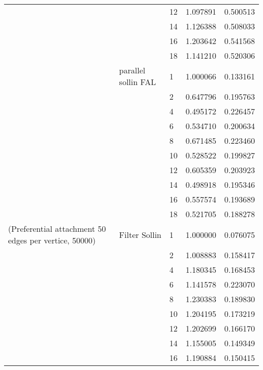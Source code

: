 \begin{tabular}{lllrr}
                      &                     & 12 &  1.097891 &  0.500513 \\
                      &                     & 14 &  1.126388 &  0.508033 \\
                      &                     & 16 &  1.203642 &  0.541568 \\
                      &                     & 18 &  1.141210 &  0.520306 \\
                      & parallel sollin FAL & 1  &  1.000066 &  0.133161 \\
                      &                     & 2  &  0.647796 &  0.195763 \\
                      &                     & 4  &  0.495172 &  0.226457 \\
                      &                     & 6  &  0.534710 &  0.200634 \\
                      &                     & 8  &  0.671485 &  0.223460 \\
                      &                     & 10 &  0.528522 &  0.199827 \\
                      &                     & 12 &  0.605359 &  0.203923 \\
                      &                     & 14 &  0.498918 &  0.195346 \\
                      &                     & 16 &  0.557574 &  0.193689 \\
                      &                     & 18 &  0.521705 &  0.188278 \\
(Preferential attachment 50 edges per vertice, 50000) & Filter Sollin & 1  &  1.000000 &  0.076075 \\
                      &                     & 2  &  1.008883 &  0.158417 \\
                      &                     & 4  &  1.180345 &  0.168453 \\
                      &                     & 6  &  1.141578 &  0.223070 \\
                      &                     & 8  &  1.230383 &  0.189830 \\
                      &                     & 10 &  1.204195 &  0.173219 \\
                      &                     & 12 &  1.202699 &  0.166170 \\
                      &                     & 14 &  1.155005 &  0.149349 \\
                      &                     & 16 &  1.190884 &  0.150415 \\

\end{tabular}
